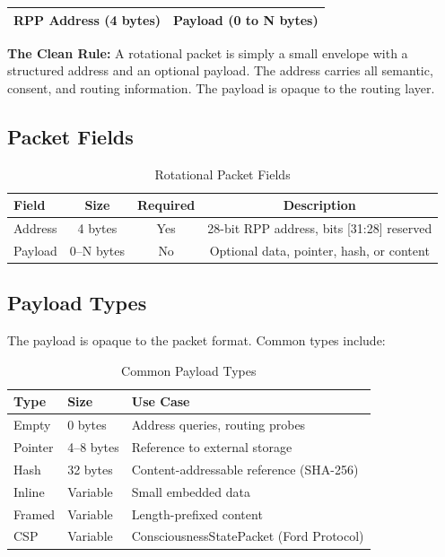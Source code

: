 \documentclass[11pt,a4paper]{article}
\begin{document}
\begin{center}
\begin{tabular}{|c|c|}
\hline
\textbf{RPP Address (4 bytes)} & \textbf{Payload (0 to N bytes)} \\
\hline
\end{tabular}
\end{center}

\noindent\textbf{The Clean Rule:} A rotational packet is simply a small envelope with a structured address and an optional payload. The address carries all semantic, consent, and routing information. The payload is opaque to the routing layer.

\subsection{Packet Fields}

\begin{table}[h]
\centering
\begin{tabular}{lccc}
\toprule
\textbf{Field} & \textbf{Size} & \textbf{Required} & \textbf{Description} \\
\midrule
Address & 4 bytes & Yes & 28-bit RPP address, bits [31:28] reserved \\
Payload & 0--N bytes & No & Optional data, pointer, hash, or content \\
\bottomrule
\end{tabular}
\caption{Rotational Packet Fields}
\end{table}

\subsection{Payload Types}

The payload is opaque to the packet format. Common types include:

\begin{table}[h]
\centering
\begin{tabular}{lll}
\toprule
\textbf{Type} & \textbf{Size} & \textbf{Use Case} \\
\midrule
Empty & 0 bytes & Address queries, routing probes \\
Pointer & 4--8 bytes & Reference to external storage \\
Hash & 32 bytes & Content-addressable reference (SHA-256) \\
Inline & Variable & Small embedded data \\
Framed & Variable & Length-prefixed content \\
CSP & Variable & ConsciousnessStatePacket (Ford Protocol) \\
\bottomrule
\end{tabular}
\caption{Common Payload Types}
\end{table}
\end{document}
